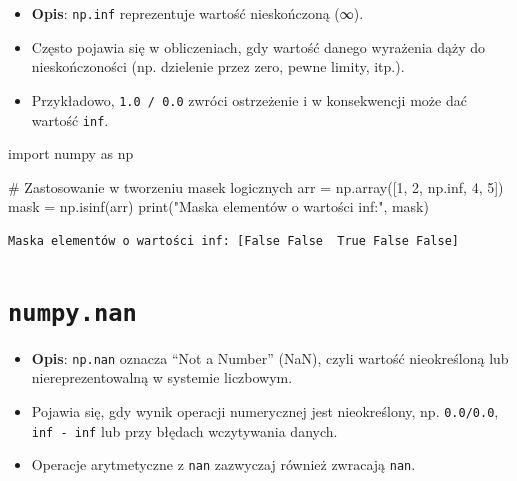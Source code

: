 \documentclass[
  letterpaper,
  DIV=11,
  numbers=noendperiod]{scrreprt}
\newenvironment{Shaded}{\begin{snugshade}}{\end{snugshade}}
\newcommand{\BuiltInTok}[1]{\textcolor[rgb]{0.00,0.23,0.31}{#1}}
\newcommand{\CommentTok}[1]{\textcolor[rgb]{0.37,0.37,0.37}{#1}}
\newcommand{\DecValTok}[1]{\textcolor[rgb]{0.68,0.00,0.00}{#1}}
\newcommand{\ImportTok}[1]{\textcolor[rgb]{0.00,0.46,0.62}{#1}}
\newcommand{\NormalTok}[1]{\textcolor[rgb]{0.00,0.23,0.31}{#1}}
\newcommand{\OperatorTok}[1]{\textcolor[rgb]{0.37,0.37,0.37}{#1}}
\newcommand{\StringTok}[1]{\textcolor[rgb]{0.13,0.47,0.30}{#1}}
\providecommand{\tightlist}{%
  \setlength{\itemsep}{0pt}\setlength{\parskip}{0pt}}\usepackage{longtable,booktabs,array}
\begin{document}
\begin{itemize}
\tightlist
\item
  \textbf{Opis}: \texttt{np.inf} reprezentuje wartość nieskończoną
  (∞).\\
\item
  Często pojawia się w obliczeniach, gdy wartość danego wyrażenia dąży
  do nieskończoności (np. dzielenie przez zero, pewne limity, itp.).\\
\item
  Przykładowo, \texttt{1.0\ /\ 0.0} zwróci ostrzeżenie i w konsekwencji
  może dać wartość \texttt{inf}.
\end{itemize}

\begin{Shaded}
\begin{Highlighting}[]
\ImportTok{import}\NormalTok{ numpy }\ImportTok{as}\NormalTok{ np}

\CommentTok{\# Zastosowanie w tworzeniu masek logicznych}
\NormalTok{arr }\OperatorTok{=}\NormalTok{ np.array([}\DecValTok{1}\NormalTok{, }\DecValTok{2}\NormalTok{, np.inf, }\DecValTok{4}\NormalTok{, }\DecValTok{5}\NormalTok{])}
\NormalTok{mask }\OperatorTok{=}\NormalTok{ np.isinf(arr)}
\BuiltInTok{print}\NormalTok{(}\StringTok{"Maska elementów o wartości inf:"}\NormalTok{, mask)}
\end{Highlighting}
\end{Shaded}

\begin{verbatim}
Maska elementów o wartości inf: [False False  True False False]
\end{verbatim}

\section{\texorpdfstring{\texttt{numpy.nan}}{numpy.nan}}\label{numpy.nan}

\begin{itemize}
\tightlist
\item
  \textbf{Opis}: \texttt{np.nan} oznacza ``Not a Number'' (NaN), czyli
  wartość nieokreśloną lub niereprezentowalną w systemie liczbowym.\\
\item
  Pojawia się, gdy wynik operacji numerycznej jest nieokreślony, np.
  \texttt{0.0/0.0}, \texttt{inf\ -\ inf} lub przy błędach wczytywania
  danych.\\
\item
  Operacje arytmetyczne z \texttt{nan} zazwyczaj również zwracają
  \texttt{nan}.
\end{itemize}
\end{document}

